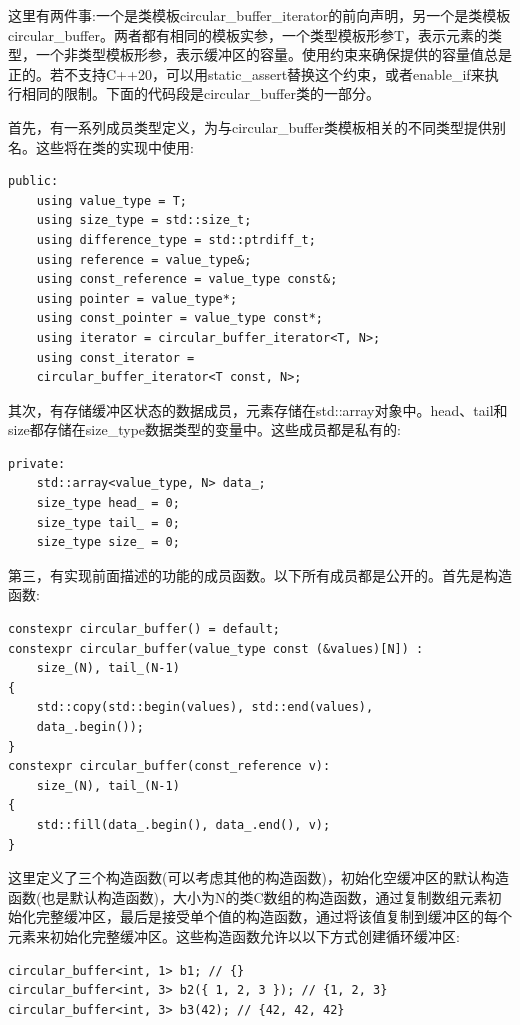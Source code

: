 这里有两件事:一个是类模板circular\_buffer\_iterator的前向声明，另一个是类模板circular\_buffer。两者都有相同的模板实参，一个类型模板形参T，表示元素的类型，一个非类型模板形参，表示缓冲区的容量。使用约束来确保提供的容量值总是正的。若不支持C++20，可以用static\_assert替换这个约束，或者enable\_if来执行相同的限制。下面的代码段是circular\_buffer类的一部分。

首先，有一系列成员类型定义，为与circular\_buffer类模板相关的不同类型提供别名。这些将在类的实现中使用:

\begin{lstlisting}[style=styleCXX]
	public:
	using value_type = T;
	using size_type = std::size_t;
	using difference_type = std::ptrdiff_t;
	using reference = value_type&;
	using const_reference = value_type const&;
	using pointer = value_type*;
	using const_pointer = value_type const*;
	using iterator = circular_buffer_iterator<T, N>;
	using const_iterator =
	circular_buffer_iterator<T const, N>;
\end{lstlisting}

其次，有存储缓冲区状态的数据成员，元素存储在std::array对象中。head、tail和size都存储在size\_type数据类型的变量中。这些成员都是私有的:

\begin{lstlisting}[style=styleCXX]
private:
	std::array<value_type, N> data_;
	size_type head_ = 0;
	size_type tail_ = 0;
	size_type size_ = 0;
\end{lstlisting}

第三，有实现前面描述的功能的成员函数。以下所有成员都是公开的。首先是构造函数:

\begin{lstlisting}[style=styleCXX]
constexpr circular_buffer() = default;
constexpr circular_buffer(value_type const (&values)[N]) :
	size_(N), tail_(N-1)
{
	std::copy(std::begin(values), std::end(values),
	data_.begin());
}
constexpr circular_buffer(const_reference v):
	size_(N), tail_(N-1)
{
	std::fill(data_.begin(), data_.end(), v);
}
\end{lstlisting}

这里定义了三个构造函数(可以考虑其他的构造函数)，初始化空缓冲区的默认构造函数(也是默认构造函数)，大小为N的类C数组的构造函数，通过复制数组元素初始化完整缓冲区，最后是接受单个值的构造函数，通过将该值复制到缓冲区的每个元素来初始化完整缓冲区。这些构造函数允许以以下方式创建循环缓冲区:

\begin{lstlisting}[style=styleCXX]
circular_buffer<int, 1> b1; // {}
circular_buffer<int, 3> b2({ 1, 2, 3 }); // {1, 2, 3}
circular_buffer<int, 3> b3(42); // {42, 42, 42}
\end{lstlisting}

